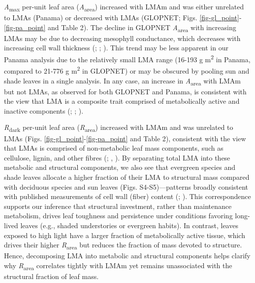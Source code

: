\documentclass[
  12pt,
  letterpaper,
  DIV=11,
  numbers=noendperiod]{scrartcl}
\begin{document}
\emph{A}\textsubscript{max} per-unit leaf area
(\emph{A}\textsubscript{area}) increased with LMAm and was either
unrelated to LMAs (Panama) or decreased with LMAs (GLOPNET; Figs.
\ref{fig-gl_point}-\ref{fig-pa_point} and Table 2). The decline in
GLOPNET \emph{A}\textsubscript{area} with increasing LMAs may be due to
decreasing mesophyll conductance, which decreases with increasing cell
wall thickness (;
;
). This trend may be less
apparent in our Panama analysis due to the relatively small LMA range
(16-193 g m\textsuperscript{2} in Panama, compared to 21-776 g
m\textsuperscript{2} in GLOPNET) or may be obscured by pooling sun and
shade leaves in a single analysis. In any case, an increase in
\emph{A}\textsubscript{area} with LMAm but not LMAs, as observed for
both GLOPNET and Panama, is consistent with the view that LMA is a
composite trait comprised of metabolically active and inactive
components (;
;
).

\emph{R}\textsubscript{dark} per-unit leaf area
(\emph{R}\textsubscript{area}) increased with LMAm and was unrelated to
LMAs (Figs. \ref{fig-gl_point}-\ref{fig-pa_point} and Table 2),
consistent with the view that LMAs is comprised of non-metabolic leaf
mass components, such as cellulose, lignin, and other fibres
(;
,
). By separating total LMA into these
metabolic and structural components, we also see that evergreen species
and shade leaves allocate a higher fraction of their LMA to structural
mass compared with deciduous species and sun leaves (Figs.
S4-S5)---patterns broadly consistent with published measurements of cell
wall (fiber) content (;
). This correspondence
supports our inference that structural investment, rather than
maintenance metabolism, drives leaf toughness and persistence under
conditions favoring long-lived leaves (e.g., shaded understories or
evergreen habits). In contrast, leaves exposed to high light have a
larger fraction of metabolically active tissue, which drives their
higher \emph{R}\textsubscript{area} but reduces the fraction of mass
devoted to structure. Hence, decomposing LMA into metabolic and
structural components helps clarify why \emph{R}\textsubscript{area}
correlates tightly with LMAm yet remains unassociated with the
structural fraction of leaf mass.
\end{document}
